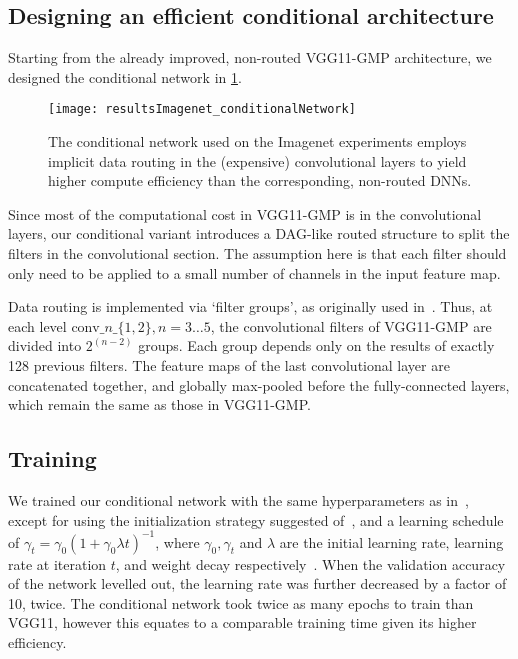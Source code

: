 \documentclass[thesis]{subfiles}
\begin{document}
	\subsection{Designing an efficient conditional architecture}
	Starting from the already improved, non-routed VGG11-GMP architecture, we designed the conditional network in \cref{fig:Imagenet_CondNet}.
	\begin{figure}[tbp]
		\centering
		\texttt{[image: resultsImagenet\_conditionalNetwork]}
		\caption[Conditional network used with Imagenet ILSVRC experiments]{The conditional network used on the Imagenet experiments employs implicit data routing in the (expensive) convolutional layers to yield higher compute efficiency than the corresponding, non-routed DNNs.}
		\label{fig:Imagenet_CondNet}
	\end{figure}
	Since most of the computational cost in VGG11-GMP is in the convolutional layers, our conditional variant 
	introduces a DAG-like routed structure to split the filters in the convolutional section.
	The assumption here is that each filter should only need to be applied to a small number of channels in the input feature map.
	
	Data routing is implemented via `filter groups', as originally used in~\citep{Krizhevsky2012}. 
	Thus, at each level $\textrm{conv}\_n\_\{1,2\}, n=3\ldots 5$, the convolutional filters of VGG11-GMP are 
	divided into $2^{(n-2)}$ groups. Each group depends only on the results of exactly 128 previous filters. 
	The feature maps of the last convolutional layer are concatenated together, and globally max-pooled
	before the fully-connected layers, which remain the same as those in VGG11-GMP.
	
	\subsection{Training}
	We trained our conditional network with the same hyperparameters as in~\citep{Simonyan2014verydeep}, 
	except for using the initialization strategy suggested of~\citep{He2015b}, and a learning schedule of 
	$\gamma_t = \gamma_0(1+\gamma_0\lambda t)^{-1}$, where $\gamma_0,\gamma_t$ and $\lambda$ 
	are the initial learning rate, learning rate at iteration $t$, and weight decay respectively~\citep{Bottou2012sgdtricks}. 
	When the validation accuracy of the network levelled out, the learning rate was further decreased by a factor of 10, twice. 
	The conditional network took twice as many epochs to train than VGG11, however this equates to a comparable
	training time given its higher efficiency.
	
\end{document}
